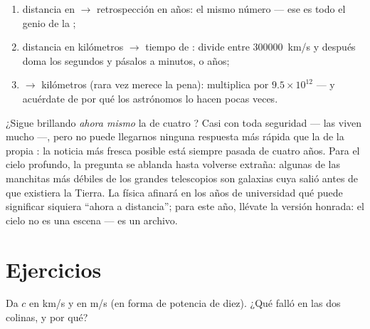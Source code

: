 \begin{method}\label{met:g8:speed-of-light:convert}
\begin{enumerate}
  \item distancia en  $\to$ retrospección en años: el
        mismo número --- ese es todo el genio de la
        ;
  \item distancia en kilómetros $\to$ tiempo de : divide entre
        \qty{300000}{km/s} y después doma los segundos y pásalos a
        minutos,  o años;
  \item {} $\to$ kilómetros (rara vez merece la pena):
        multiplica por $9.5 \times 10^{12}$ --- y acuérdate de por
        qué los astrónomos lo hacen pocas veces.
\end{enumerate}
\end{method}

\begin{remark}\label{rem:g8:speed-of-light:now}
¿Sigue brillando \emph{ahora mismo} la  de
cuatro ? Casi con toda seguridad --- las
 viven mucho ---, pero no puede llegarnos ninguna
respuesta más rápida que la de la propia : la noticia más
fresca posible está siempre pasada de cuatro años. Para el cielo
profundo, la pregunta se ablanda hasta volverse extraña: algunas de las
manchitas más débiles de los grandes telescopios son galaxias cuya
 salió antes de que existiera la Tierra. La física afinará en
los años de universidad qué puede significar siquiera ``ahora a
distancia''; para este año, llévate la versión honrada: el cielo no es
una escena --- es un archivo.
\end{remark}

\section{Ejercicios}

\begin{exercise}[$\star$]\label{exo:g8:speed-of-light:1}
Da $c$ en \unit{km/s} y en \unit{m/s} (en forma de potencia de diez).
¿Qué falló en las dos colinas, y por qué?
\end{exercise}

